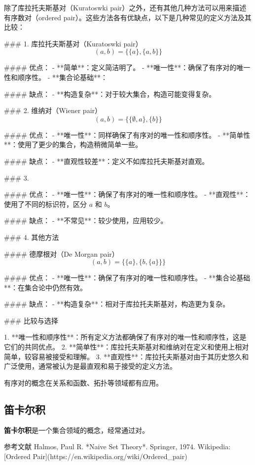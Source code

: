 除了库拉托夫斯基对（Kuratoswki pair）之外，还有其他几种方法可以用来描述有序数对（ordered pair）。这些方法各有优缺点，以下是几种常见的定义方法及其比较：

### 1. 库拉托夫斯基对（Kuratoswki pair）
\[ (a, b) = \{\{a\}, \{a, b\}\} \]

#### 优点：
- **简单**：定义简洁明了。
- **唯一性**：确保了有序对的唯一性和顺序性。
- **集合论基础**：

#### 缺点：
- **构造复杂**：对于较大集合，构造可能变得复杂。

### 2. 维纳对（Wiener pair）
\[ (a, b) = \{\{\emptyset, a\}, \{b\}\} \]

#### 优点：
- **唯一性**：同样确保了有序对的唯一性和顺序性。
- **简单性**：使用了更少的集合，构造稍微简单一些。

#### 缺点：
- **直观性较差**：定义不如库拉托夫斯基对直观。

### 3. 

#### 优点：
- **唯一性**：确保了有序对的唯一性和顺序性。
- **直观性**：使用了不同的标识符，区分 \(a\) 和 \(b\)。

#### 缺点：
- **不常见**：较少使用，应用较少。

### 4. 其他方法

#### 德摩根对（De Morgan pair）
\[ (a, b) = \{\{a\}, \{b, \{a\}\}\} \]

#### 优点：
- **唯一性**：确保了有序对的唯一性和顺序性。
- **集合论基础**：在集合论中仍然有效。

#### 缺点：
- **构造复杂**：相对于库拉托夫斯基对，构造更为复杂。

### 比较与选择

1. **唯一性和顺序性**：所有定义方法都确保了有序对的唯一性和顺序性，这是它们的共同优点。
2. **简单性**：库拉托夫斯基对和维纳对在定义和使用上相对简单，较容易被接受和理解。
3. **直观性**：库拉托夫斯基对由于其历史悠久和广泛使用，通常被认为是最直观和易于接受的定义方法。

有序对的概念在关系和函数、拓扑等领域都有应用。


\subsection{笛卡尔积}

\textbf{笛卡尔积}是一个集合领域的概念，经常通过对。

参考文献
Halmos, Paul R. *Naive Set Theory*. Springer, 1974.
Wikipedia: [Ordered Pair](https://en.wikipedia.org/wiki/Ordered_pair)